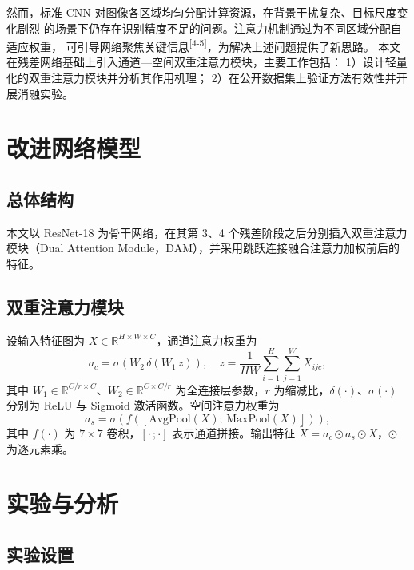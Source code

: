 \documentclass[twocolumn,zihao=5,a4paper]{ctexart}
\begin{document}
然而，标准 CNN 对图像各区域均匀分配计算资源，在背景干扰复杂、目标尺度变化剧烈
的场景下仍存在识别精度不足的问题。注意力机制通过为不同区域分配自适应权重，
可引导网络聚焦关键信息\textsuperscript{[4-5]}，为解决上述问题提供了新思路。
本文在残差网络基础上引入通道—空间双重注意力模块，主要工作包括：
1）设计轻量化的双重注意力模块并分析其作用机理；
2）在公开数据集上验证方法有效性并开展消融实验。

\section{改进网络模型}

\subsection{总体结构}

\quad 本文以 ResNet-18 为骨干网络，在其第 3、4 个残差阶段之后分别插入双重注意力
模块（Dual Attention Module，DAM），并采用跳跃连接融合注意力加权前后的特征。

\subsection{双重注意力模块}

\quad 设输入特征图为 $X \in \mathbb{R}^{H \times W \times C}$，通道注意力权重为
\begin{equation}
  a_c = \sigma\left( W_2\, \delta\left( W_1\, z \right) \right),
  \quad z = \frac{1}{HW} \sum_{i=1}^{H} \sum_{j=1}^{W} X_{ijc},
\end{equation}
其中 $W_1 \in \mathbb{R}^{C/r \times C}$、$W_2 \in \mathbb{R}^{C \times C/r}$
为全连接层参数，$r$ 为缩减比，$\delta(\cdot)$、$\sigma(\cdot)$ 分别为 ReLU 与
Sigmoid 激活函数。空间注意力权重为
\begin{equation}
  a_s = \sigma\left( f\left( \left[ \mathrm{AvgPool}(X);\, \mathrm{MaxPool}(X) \right] \right) \right),
\end{equation}
其中 $f(\cdot)$ 为 $7 \times 7$ 卷积，$[\cdot\,;\cdot]$ 表示通道拼接。输出特征
$\tilde{X} = a_c \odot a_s \odot X$，$\odot$ 为逐元素乘。

\section{实验与分析}

\subsection{实验设置}
\end{document}
